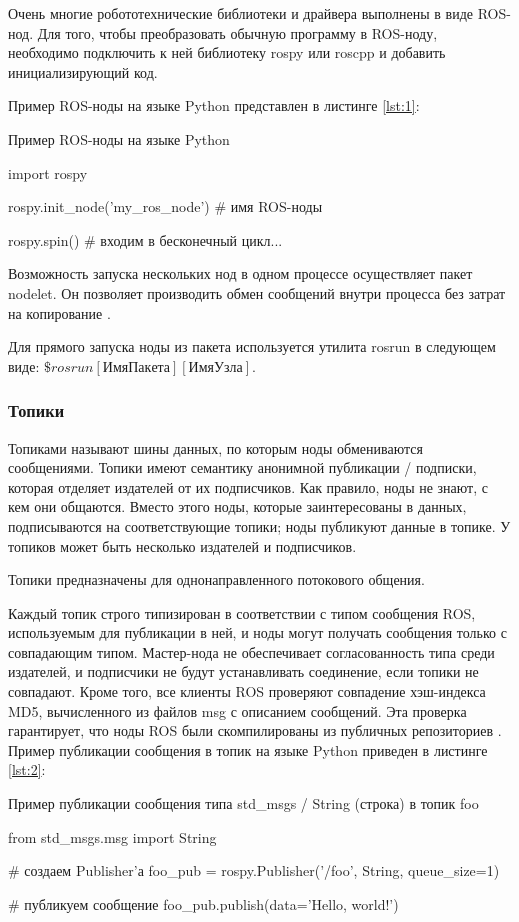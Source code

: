 Очень многие робототехнические библиотеки и драйвера выполнены в виде ROS-нод.
Для того, чтобы преобразовать обычную программу в ROS-ноду, необходимо подключить к ней библиотеку rospy или roscpp и добавить инициализирующий код.

Пример ROS-ноды на языке Python представлен в листинге \ref{lst:1}:

\begin{Program}[H]
	\caption{Пример ROS-ноды на языке Python} \label{lst:1}
\begin{MyCode}
import rospy

rospy.init_node('my_ros_node')  # имя ROS-ноды

rospy.spin()  # входим в бесконечный цикл...
\end{MyCode}
\end{Program}

Возможность запуска нескольких нод в одном процессе осуществляет пакет nodelet. Он позволяет производить обмен сообщений внутри процесса без затрат на копирование \cite{ros}.

Для прямого запуска ноды из пакета используется утилита rosrun в следующем виде: \(\$ rosrun [ИмяПакета] [ИмяУзла]\).

\subsubsection{Топики}
Топиками называют шины данных, по которым ноды обмениваются сообщениями. Топики имеют семантику анонимной публикации / подписки, которая отделяет издателей от их подписчиков. Как правило, ноды не знают, с кем они общаются. Вместо этого ноды, которые заинтересованы в данных, подписываются на соответствующие топики; ноды публикуют данные в топике. У топиков может быть несколько издателей и подписчиков.

Топики предназначены для однонаправленного потокового общения.

Каждый топик строго типизирован в соответствии с типом сообщения ROS, используемым для публикации в ней, и ноды могут получать сообщения только с совпадающим типом. Мастер-нода не обеспечивает согласованность типа среди издателей, и подписчики не будут устанавливать соединение, если топики не совпадают. Кроме того, все клиенты ROS проверяют совпадение хэш-индекса MD5, вычисленного из файлов msg с описанием сообщений. Эта проверка гарантирует, что ноды ROS были скомпилированы из публичных репозиториев \cite{ros}. Пример публикации сообщения в топик на языке Python приведен в листинге \ref{lst:2}:
\begin{Program}[H]
	\caption{Пример публикации сообщения типа std\_msgs / String (строка) в топик foo} \label{lst:2}
\begin{MyCode}
from std_msgs.msg import String

# создаем Publisher'а
foo_pub = rospy.Publisher('/foo', String, queue_size=1)

# публикуем сообщение
foo_pub.publish(data='Hello, world!')
\end{MyCode}
\end{Program}

